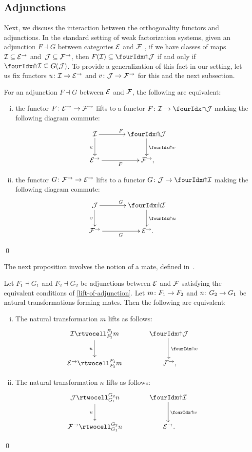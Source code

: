 \documentclass[reqno,10pt,a4paper,oneside,draft]{amsart}
\begin{document}
\subsection*{Adjunctions}

Next, we discuss the interaction between the orthogonality functors and adjunctions.
In the standard setting of weak factorization systems, given an
 adjunction $F \dashv G$ between categories $\cal{E}$ and $\cal{F}$ ,  if we have classes of maps $\cal{I} \subseteq \catE^\to$ and~$\cal{J} \subseteq \cal{F}^\to$, then $F(\cal{I}) \subseteq \liftl{\cal{J}}$ if and only if $\liftr{\cal{I}} \subseteq G(\cal{J})$. To provide a generalization of this fact in our setting, let us fix functors $u \co \cal{I} \to \catE^\to$ and $v \co \cal{J} \to \cal{F}^\to$ for this and the next subsection.

\begin{proposition} \label{lift-of-adjunction}
For an adjunction $F \dashv G$ between $\cal{E}$ and $\cal{F}$, the following are equivalent:
\begin{enumerate}[(i)]
\item the functor $F \co \catE^\to \to \cal{F}^\to$ lifts to a functor $F \co \cal{I} \to \liftl{\cal{J}}$ making the following diagram commute:
\[
\xymatrix@C=1.2cm{
  \cal{I}
  \ar[r]^{F}
  \ar[d]_{u}
&
  \liftl{\cal{J}}
  \ar[d]^{\liftl{v}}
\\
  \catE^\to
  \ar[r]_-{F}
&
  \cal{F}^\to
\rlap{,}}
\]
\item the functor $G \co \cal{F}^\to \to \catE^\to$ lifts to a functor $G \co \cal{J} \to \liftr{\cal{I}}$ making the following diagram commute:
\[
\xymatrix@C=1.2cm{
  \cal{J}
    \ar[d]_{v}
\ar[r]^{G}
&
  \liftr{\cal{I}}
  \ar[d]^{\liftr{u}}
\\
  \cal{F}^\to
   \ar[r]_{G}
&
  \catE^\to
\rlap{.}  } 
\]
\end{enumerate}
\qed
\end{proposition}

The next proposition involves the notion of a mate, defined in~\cite{kelly-street}.

\begin{proposition} \label{lift-of-mates}
Let $F_1 \dashv G_1$ and $F_2 \dashv G_2$ be adjunctions between $\cal{E}$ and $\cal{F}$ satisfying the equivalent conditions of \cref{lift-of-adjunction}.
Let $m \co F_1 \to F_2$ and $n \co G_2 \to G_1$ be natural transformations forming mates. Then the following are equivalent:
\begin{enumerate}[(i)]
\item
The natural transformation $m$ lifts as follows:
\[
\xymatrix@C=1.2cm{
  \cal{I}
  \rtwocell_{F_2}^{F_1}{m}
  \ar[d]_{u}
&
  \liftl{\cal{J}}
  \ar[d]^{\liftl{v}}
\\
  \catE^\to
  \rtwocell_{F_2}^{F_1}{m}
&
  \cal{F}^\to
\rlap{,}}
\]
\item
The natural transformation $n$ lifts as follows:
\[
\xymatrix@C=1.2cm{
  \cal{J}
  \rtwocell_{G_1}^{G_2}{n}
  \ar[d]_{u}
&
  \liftr{\cal{I}}
  \ar[d]^{\liftl{v}}
\\
  \cal{F}^\to
  \rtwocell_{G_1}^{G_2}{n}
&
  \cal{E}^\to
\rlap{.}}
\]
\end{enumerate}
\qed
\end{proposition}
\end{document}
